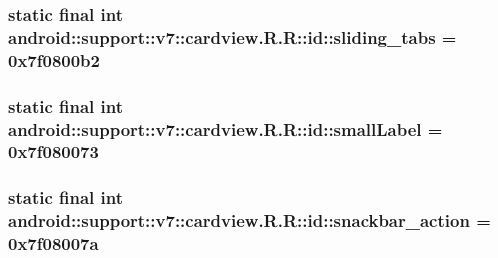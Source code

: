 \hypertarget{classandroid_1_1support_1_1v7_1_1cardview_1_1_r_1_1id_31d04f49b1ea188aa8d187deed9c6f5c}{
\subsubsection[{sliding\_\-tabs}]{\setlength{\rightskip}{0pt plus 5cm}static final int android::support::v7::cardview.R.R::id::sliding\_\-tabs = 0x7f0800b2}}
\label{classandroid_1_1support_1_1v7_1_1cardview_1_1_r_1_1id_31d04f49b1ea188aa8d187deed9c6f5c}


\hypertarget{classandroid_1_1support_1_1v7_1_1cardview_1_1_r_1_1id_4c06b328471f7b86a7e1d93283816cec}{
\subsubsection[{smallLabel}]{\setlength{\rightskip}{0pt plus 5cm}static final int android::support::v7::cardview.R.R::id::smallLabel = 0x7f080073}}
\label{classandroid_1_1support_1_1v7_1_1cardview_1_1_r_1_1id_4c06b328471f7b86a7e1d93283816cec}


\hypertarget{classandroid_1_1support_1_1v7_1_1cardview_1_1_r_1_1id_676e2f583f26ef4ad186045e28befc95}{
\subsubsection[{snackbar\_\-action}]{\setlength{\rightskip}{0pt plus 5cm}static final int android::support::v7::cardview.R.R::id::snackbar\_\-action = 0x7f08007a}}
\label{classandroid_1_1support_1_1v7_1_1cardview_1_1_r_1_1id_676e2f583f26ef4ad186045e28befc95}


